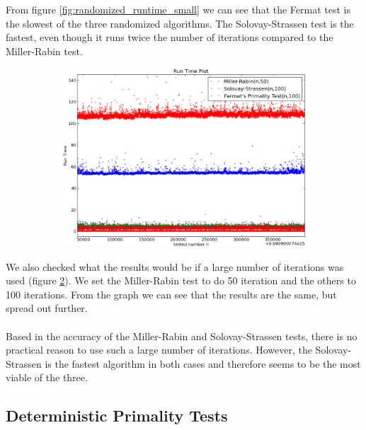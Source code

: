 \documentclass[compressed,final,notitlepage,narroweqnarray,inline,twoside,]{ieee}
\begin{document}
From figure \ref{fig:randomized_runtime_small} we can see that the Fermat test is the slowest of the three randomized algorithms. The Solovay-Strassen test is the fastest, even though it runs twice the number of iterations compared to the Miller-Rabin test. 
\begin{figure}
        \centering
        \begin{subfigure}[b]{0.5\textwidth}
                \includegraphics[width=\textwidth]{../images/all_singlethread_runtime}
                \label{fig:gull}
        \end{subfigure}
        \vspace{-30pt}\caption{}\label{fig:mr_ss_fpt_serial_runtime}
\end{figure}
We also checked what the results would be if a large number of iterations was used (figure \ref{fig:mr_ss_fpt_serial_runtime}). We set the Miller-Rabin test to do 50 iteration and the others to 100 iterations. From the graph we can see that the results are the same, but spread out further.\\\\ Based in the accuracy of the Miller-Rabin and Solovay-Strassen tests, there is no practical reason to use such a large number of iterations. However, the Solovay-Strassen is the fastest algorithm in both cases and therefore seems to be the most viable of the three.
\subsection{Deterministic Primality Tests}
\end{document}
